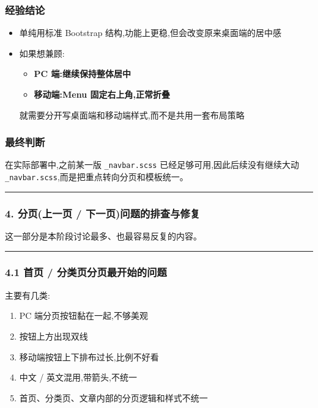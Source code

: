 \documentclass[lang=cn,scheme=chinese,color=blue,device=normal,toc=onecol,math=cm]{elegantbook}
\begin{document}
\subsubsection{经验结论}


\begin{itemize}
\item 单纯用标准 Bootstrap 结构,功能上更稳,但会改变原来桌面端的居中感
\item 如果想兼顾: 
\begin{itemize}
\item \textbf{PC 端:继续保持整体居中}
\item \textbf{移动端:Menu 固定右上角,正常折叠}
\end{itemize}
 
就需要分开写桌面端和移动端样式,而不是共用一套布局策略\par
\end{itemize}


\subsubsection{最终判断}


在实际部署中,之前某一版 \texttt{\_\allowbreak{}navbar.scss} 已经足够可用,因此后续没有继续大动 \texttt{\_\allowbreak{}navbar.scss},而是把重点转向分页和模板统一。\par


\medskip\hrule\medskip


\subsubsection{4. 分页(上一页 /\allowbreak{} 下一页)问题的排查与修复}


这一部分是本阶段讨论最多、也最容易反复的内容。\par


\medskip\hrule\medskip


\subsubsection{4.1 首页 /\allowbreak{} 分类页分页最开始的问题}


主要有几类:\par


\begin{enumerate}
\item PC 端分页按钮黏在一起,不够美观
\item 按钮上方出现双线
\item 移动端按钮上下排布过长,比例不好看
\item 中文 /\allowbreak{} 英文混用,带箭头,不统一
\item 首页、分类页、文章内部的分页逻辑和样式不统一
\end{enumerate}
\end{document}
